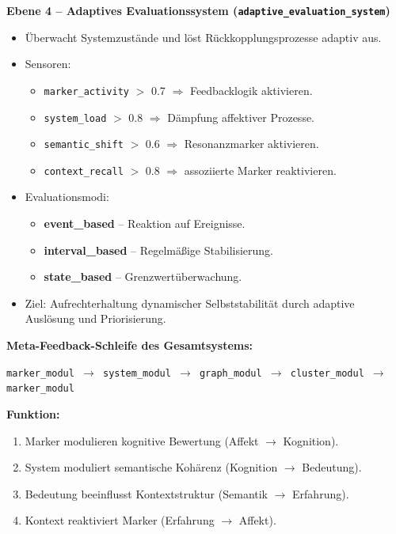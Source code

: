 \vspace{1em}
\textbf{Ebene 4 – Adaptives Evaluationssystem (\texttt{adaptive\_evaluation\_system})}

\begin{itemize}
\item Überwacht Systemzustände und löst Rückkopplungsprozesse adaptiv aus.
\item Sensoren:
    \begin{itemize}
    \item \texttt{marker\_activity} $>$ 0.7 $\Rightarrow$ Feedbacklogik aktivieren.
    \item \texttt{system\_load} $>$ 0.8 $\Rightarrow$ Dämpfung affektiver Prozesse.
    \item \texttt{semantic\_shift} $>$ 0.6 $\Rightarrow$ Resonanzmarker aktivieren.
    \item \texttt{context\_recall} $>$ 0.8 $\Rightarrow$ assoziierte Marker reaktivieren.
    \end{itemize}
\item Evaluationsmodi:
    \begin{itemize}
    \item \textbf{event\_based} – Reaktion auf Ereignisse.
    \item \textbf{interval\_based} – Regelmäßige Stabilisierung.
    \item \textbf{state\_based} – Grenzwertüberwachung.
    \end{itemize}
\item Ziel: Aufrechterhaltung dynamischer Selbststabilität durch adaptive Auslösung und Priorisierung.
\end{itemize}

\vspace{1em}
\textbf{Meta-Feedback-Schleife des Gesamtsystems:}
\begin{center}
\texttt{marker\_modul $\rightarrow$ system\_modul $\rightarrow$ graph\_modul $\rightarrow$ cluster\_modul $\rightarrow$ marker\_modul}
\end{center}

\textbf{Funktion:}
\begin{enumerate}
\item Marker modulieren kognitive Bewertung (Affekt $\rightarrow$ Kognition).
\item System moduliert semantische Kohärenz (Kognition $\rightarrow$ Bedeutung).
\item Bedeutung beeinflusst Kontextstruktur (Semantik $\rightarrow$ Erfahrung).
\item Kontext reaktiviert Marker (Erfahrung $\rightarrow$ Affekt).
\end{enumerate}

